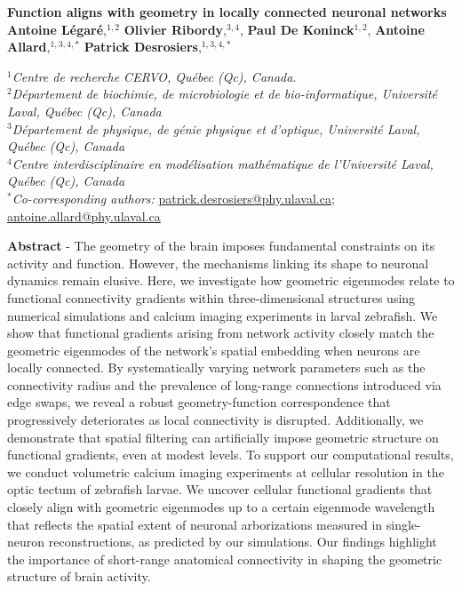\documentclass{article}
\begin{document}
\begin{center}

    {\Large \textbf{Function aligns with geometry in locally connected neuronal networks}}\\
    
    \vspace{10 pt}
    \textbf{Antoine Légaré},$^{1,2}$ \textbf{Olivier Ribordy},$^{3,4}$, \textbf{Paul De Koninck}$^{1,2}$, \textbf{Antoine Allard},$^{1,3,4,*}$ \textbf{Patrick Desrosiers},$^{1,3,4,*}$ \\
    \vspace{5 pt}
    
    $^1$\textit{Centre de recherche CERVO, Québec (Qc), Canada.}\\
    $^2$\textit{Département de biochimie, de microbiologie et de bio-informatique, Université Laval, Québec (Qc), Canada}\\
    $^3$\textit{D\'epartement de physique, de g\'enie physique et d'optique, Universit\'e Laval, Qu\'ebec (Qc), Canada}\\%
    $^4$\textit{Centre interdisciplinaire en mod\'elisation math\'ematique de l'Universit\'e Laval, Qu\'ebec (Qc), Canada}\\
    $^*$\textit{Co-corresponding authors:} \href{mailto:patrick.desrosiers@phy.ulaval.ca}{patrick.desrosiers@phy.ulaval.ca}; \href{mailto:antoine.allard@nphy.ulaval.ca}{antoine.allard@phy.ulaval.ca}

\end{center}

\vspace{4 pt}

\hrulefill

\textbf{Abstract} - The geometry of the brain imposes fundamental constraints on its activity and function. However, the mechanisms linking its shape to neuronal dynamics remain elusive. Here, we investigate how geometric eigenmodes relate to functional connectivity gradients within three-dimensional structures using numerical simulations and calcium imaging experiments in larval zebrafish. We show that functional gradients arising from network activity closely match the geometric eigenmodes of the network’s spatial embedding when neurons are locally connected. By systematically varying network parameters such as the connectivity radius and the prevalence of long-range connections introduced via edge swaps, we reveal a robust geometry-function correspondence that progressively deteriorates as local connectivity is disrupted. Additionally, we demonstrate that spatial filtering can artificially impose geometric structure on functional gradients, even at modest levels. To support our computational results, we conduct volumetric calcium imaging experiments at cellular resolution in the optic tectum of zebrafish larvae. We uncover cellular functional gradients that closely align with geometric eigenmodes up to a certain eigenmode wavelength that reflects the spatial extent of neuronal arborizations measured in single-neuron reconstructions, as predicted by our simulations. Our findings highlight the importance of short-range anatomical connectivity in shaping the geometric structure of brain activity.
\end{document}
